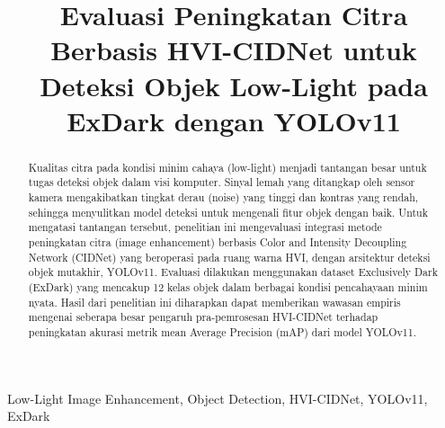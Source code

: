 \documentclass[conference]{IEEEtran}
\begin{document}
\title{Evaluasi Peningkatan Citra Berbasis HVI-CIDNet untuk Deteksi Objek Low-Light pada ExDark dengan YOLOv11}

\author{
\and
{}
}


\maketitle

\begin{abstract}
Kualitas citra pada kondisi minim cahaya (low-light) menjadi tantangan besar untuk tugas deteksi objek dalam visi komputer. Sinyal lemah yang ditangkap oleh sensor kamera mengakibatkan tingkat derau (noise) yang tinggi dan kontras yang rendah, sehingga menyulitkan model deteksi untuk mengenali fitur objek dengan baik. Untuk mengatasi tantangan tersebut, penelitian ini mengevaluasi integrasi metode peningkatan citra (image enhancement) berbasis Color and Intensity Decoupling Network (CIDNet) yang beroperasi pada ruang warna HVI, dengan arsitektur deteksi objek mutakhir, YOLOv11. Evaluasi dilakukan menggunakan dataset Exclusively Dark (ExDark) yang mencakup 12 kelas objek dalam berbagai kondisi pencahayaan minim nyata. Hasil dari penelitian ini diharapkan dapat memberikan wawasan empiris mengenai seberapa besar pengaruh pra-pemrosesan HVI-CIDNet terhadap peningkatan akurasi metrik mean Average Precision (mAP) dari model YOLOv11.
\end{abstract}

\begin{IEEEkeywords}
Low-Light Image Enhancement, Object Detection, HVI-CIDNet, YOLOv11, ExDark
\end{IEEEkeywords}

\end{document}
